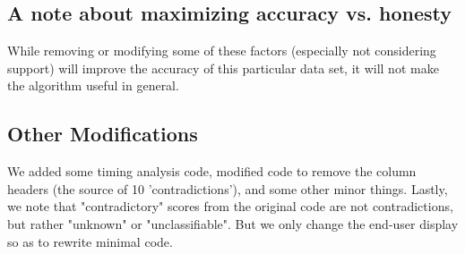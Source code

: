 \documentclass[12pt, a4, epsf] {article}
\theoremstyle{plain}
\theoremstyle{definition}
\begin{document}
\subsection*{A note about maximizing accuracy vs. honesty}
While removing or modifying some of these factors (especially not considering support) will improve the accuracy of this particular data set, it will not make the algorithm useful in general. 
\subsection*{Other Modifications}
We added some timing analysis code, modified code to remove the column headers (the source of 10 'contradictions'), and some other minor things. Lastly, we note that "contradictory" scores from the original code are not contradictions, but rather "unknown" or "unclassifiable". But we only change the end-user display so as to rewrite minimal code. 
\end{document}
